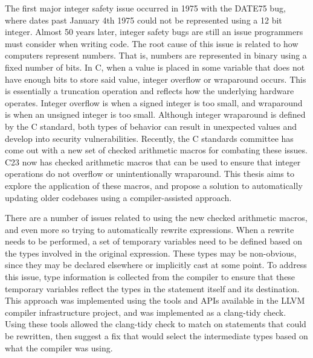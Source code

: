 \abstract

The first major integer safety issue occurred in 1975 with the DATE75 bug, where dates past January 4th 1975 could not be represented using a 12 bit integer. Almost 50 years later, integer safety bugs are still an issue programmers must consider when writing code. The root cause of this issue is related to how computers represent numbers. That is, numbers are represented in binary using a fixed number of bits. In C, when a value is placed in some variable that does not have enough bits to store said value, integer overflow or wraparound occurs. This is essentially a truncation operation and reflects how the underlying hardware operates. Integer overflow is when a signed integer is too small, and wraparound is when an unsigned integer is too small. Although integer wraparound is defined by the C standard, both types of behavior can result in unexpected values and develop into security vulnerabilities. Recently, the C standards committee has come out with a new set of checked arithmetic macros for combating these issues. C23 now has checked arithmetic macros that can be used to ensure that integer operations do not overflow or unintentionally wraparound. This thesis aims to explore the application of these macros, and propose a solution to automatically updating older codebases using a compiler-assisted approach.

There are a number of issues related to using the new checked arithmetic macros, and even more so trying to automatically rewrite expressions. When a rewrite needs to be performed, a set of temporary variables need to be defined based on the types involved in the original expression. These types may be non-obvious, since they may be declared elsewhere or implicitly cast at some point. To address this issue, type information is collected from the compiler to ensure that these temporary variables reflect the types in the statement itself and its destination. This approach was implemented using the tools and APIs available in the LLVM compiler infrastructure project, and was implemented as a clang-tidy check. Using these tools allowed the clang-tidy check to match on statements that could be rewritten, then suggest a fix that would select the intermediate types based on what the compiler was using.

